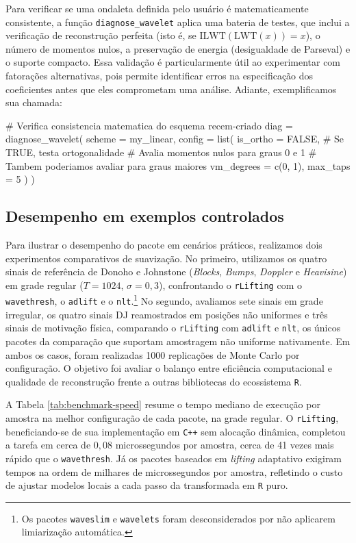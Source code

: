 Para verificar se uma ondaleta definida pelo usuário é matematicamente consistente, a função \texttt{diagnose\_wavelet} aplica uma bateria de testes, que inclui a verificação de reconstrução perfeita (isto é, se \(\text{ILWT}(\text{LWT}(x)) = x\)), o número de momentos nulos, a preservação de energia (desigualdade de Parseval) e o suporte compacto. 
Essa validação é particularmente útil ao experimentar com fatorações alternativas, pois permite identificar erros na especificação dos coeficientes antes que eles comprometam uma análise. 
Adiante, exemplificamos sua chamada:

\begin{codeblock}
# Verifica consistencia matematica do esquema recem-criado
diag = diagnose_wavelet(
  scheme = my_linear,
  config = list(
    is_ortho = FALSE, # Se TRUE, testa ortogonalidade
    # Avalia momentos nulos para graus 0 e 1 
    # Tambem poderiamos avaliar para graus maiores
    vm_degrees = c(0, 1), 
    max_taps  = 5
  )
)
\end{codeblock}


\subsection{Desempenho em exemplos controlados}\label{sec-rlifting-evidencia}

Para ilustrar o desempenho do pacote em cenários práticos, realizamos dois experimentos comparativos de suavização. 
No primeiro, utilizamos os quatro sinais de referência de Donoho e Johnstone (\emph{Blocks}, \emph{Bumps}, \emph{Doppler} e \emph{Heavisine}) em grade regular (\(T = 1024\), \(\sigma = 0{,}3\)), confrontando o \texttt{rLifting} com o \texttt{wavethresh}, o \texttt{adlift} e o \texttt{nlt}.\footnote{Os pacotes \texttt{waveslim} e \texttt{wavelets} foram desconsiderados por não aplicarem limiarização automática.} 
No segundo, avaliamos sete sinais em grade irregular, os quatro sinais DJ reamostrados em posições não uniformes e três sinais de motivação física, comparando o \texttt{rLifting} com \texttt{adlift} e \texttt{nlt}, os únicos pacotes da comparação que suportam amostragem não uniforme nativamente. 
Em ambos os casos, foram realizadas 1000 replicações de Monte Carlo por configuração. 
O objetivo foi avaliar o balanço entre eficiência computacional e qualidade de reconstrução frente a outras bibliotecas do ecossistema \texttt{R}.

A Tabela \ref{tab:benchmark-speed} resume o tempo mediano de execução por amostra na melhor configuração de cada pacote, na grade regular. 
O \texttt{rLifting}, beneficiando-se de sua implementação em \texttt{C++} sem alocação dinâmica, completou a tarefa em cerca de \(0{,}08\) microssegundos por amostra, cerca de 41 vezes mais rápido que o \texttt{wavethresh}. 
Já os pacotes baseados em \emph{lifting} adaptativo exigiram tempos na ordem de milhares de microssegundos por amostra, refletindo o custo de ajustar modelos locais a cada passo da transformada em \texttt{R} puro.

